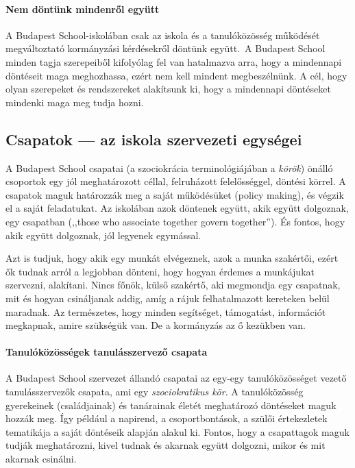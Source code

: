 \hypertarget{nem-dontunk-mindenrol-egyutt}{%
\paragraph{Nem döntünk mindenről
együtt}\label{nem-dontunk-mindenrol-egyutt}}

A Budapest School-iskolában csak az iskola és a tanulóközösség működését
megváltoztató kormányzási kérdésekről döntünk együtt.~A Budapest School
minden tagja szerepeiből kifolyólag fel van hatalmazva arra, hogy a
mindennapi döntéseit maga meghozhassa, ezért nem kell mindent
megbeszélnünk. A cél, hogy olyan szerepeket és rendszereket alakítsunk
ki, hogy a mindennapi döntéseket mindenki maga meg tudja hozni.

\hypertarget{csapatok-az-iskola-szervezeti-egysegei}{%
\subsection{Csapatok --- az iskola szervezeti
egységei}\label{csapatok-az-iskola-szervezeti-egysegei}}

A Budapest School csapatai (a szociokrácia terminológiájában a
\emph{körök}) önálló csoportok egy jól meghatározott céllal, felruházott
felelősséggel, döntési körrel. A csapatok maguk határozzák meg a saját
működésüket (policy making), és végzik el a saját feladatukat. Az
iskolában azok döntenek együtt, akik együtt dolgoznak, egy csapatban
(,,those who associate together govern together''). És fontos, hogy akik
együtt dolgoznak, jól legyenek egymással.

Azt is tudjuk, hogy akik egy munkát elvégeznek, azok a munka szakértői,
ezért ők tudnak arról a legjobban dönteni, hogy hogyan érdemes a
munkájukat szervezni, alakítani. Nincs főnök, külső szakértő, aki
megmondja egy csapatnak, mit és hogyan csináljanak addig, amíg a rájuk
felhatalmazott kereteken belül maradnak. Az természetes, hogy minden
segítséget, támogatást, információt megkapnak, amire szükségük van. De a
kormányzás az ő kezükben van.

\hypertarget{tanulokozossegek-tanulasszervezo-csapata}{%
\paragraph{Tanulóközösségek tanulásszervező
csapata}\label{tanulokozossegek-tanulasszervezo-csapata}}

A Budapest School szervezet állandó csapatai az egy-egy tanulóközösséget
vezető tanulásszervezők csapata, ami egy \emph{szociokratikus kör}. A
tanulóközösség gyerekeinek (családjainak) és tanárainak életét
meghatározó döntéseket maguk hozzák\break
meg. Így például a napirend, a
csoportbontások, a szülői értekezletek tematikája a saját döntéseik
alapján alakul ki. Fontos, hogy a csapattagok maguk tudják meghatározni,
kivel tudnak és akarnak együtt dolgozni, mikor és mit akarnak csinálni.

